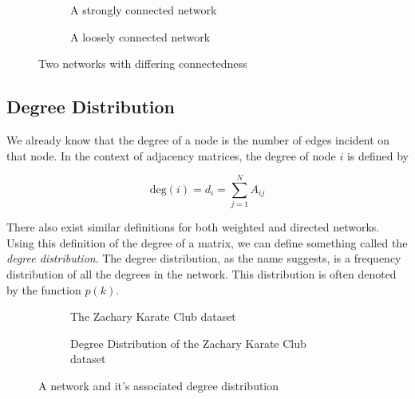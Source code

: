 \begin{figure}
    \begin{center}
        \begin{subfigure}[b]{0.45\textwidth}
            \caption{A strongly connected network}
            \label{fig:strongly_connected_network}
        \end{subfigure}
        \begin{subfigure}[b]{0.45\textwidth}
            \caption{A loosely connected network}
            \label{fig:loosely_connected_network}
        \end{subfigure}
    \end{center}
    \caption{Two networks with differing connectedness}
    \label{fig:connectivity_strengths}
\end{figure}


\subsection{Degree Distribution}
We already know that the degree of a node is the number of edges incident on that node. In the context of adjacency matrices, the degree of node $i$ is defined by 

$$
\text{deg}(i) = d_i = \sum_{j=1}^NA_{ij}
$$

There also exist similar definitions for both weighted and directed networks. Using this definition of the degree of a matrix, we can define something called the \emph{degree distribution}. The degree distribution, as the name suggests, is a frequency distribution of all the degrees in the network. This distribution is often denoted by the function $p(k)$.

\begin{figure}
    \begin{center}
        \begin{subfigure}[b]{0.45\textwidth}
            \caption{The Zachary Karate Club dataset}
            \label{fig:zachary_karate_club_degree}
        \end{subfigure}
        \begin{subfigure}[b]{0.45\textwidth}
            \caption{Degree Distribution of the Zachary Karate Club dataset}
            \label{fig:loosely_connected_network}
        \end{subfigure}
    \end{center}
    \caption{A network and it's associated degree distribution}
    \label{fig:connectivity_strengths}
\end{figure}

